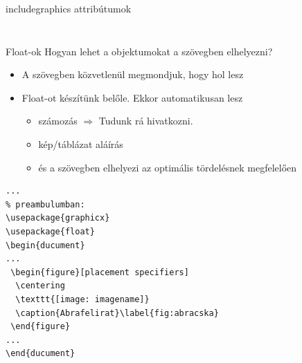 \documentclass{beamer} %
\newcommand{\myemph}[1]{{\color{blue}#1}}
\begin{document}
\begin{frame}[fragile]{includegraphics attribútumok}
\begin{columns}
\begin{column}{0.3\textwidth}
{   }
  \end{column}
 \end{columns}
\end{frame}

\begin{frame}[fragile]{Float-ok}
 \myemph{Hogyan lehet a objektumokat a szövegben elhelyezni?}
 \begin{itemize}
  \item A szövegben közvetlenül megmondjuk, hogy hol lesz
  \item Float-ot készítünk belőle. Ekkor automatikusan lesz
  \begin{itemize}
   \item számozás $\Rightarrow$ Tudunk rá hivatkozni.
   \item kép/táblázat aláírás
   \item és a szövegben elhelyezi az optimális tördelésnek megfelelően
  \end{itemize}
 \end{itemize}
 \vspace*{-20pt}
\begin{lstlisting}
...
% preambulumban:
\usepackage{graphicx}
\usepackage{float}
\begin{ducument}
...
 \begin{figure}[placement specifiers]
  \centering
  \texttt{[image: imagename]}
  \caption{Abrafelirat}\label{fig:abracska}
 \end{figure}
...
\end{ducument}
\end{lstlisting}
\end{frame}
\end{document}
